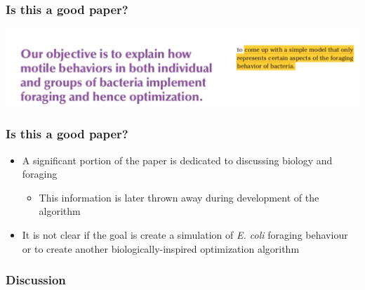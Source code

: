 \documentclass{beamer}
\begin{document}
\begin{frame}
\frametitle{Is this a good paper?}
\begin{center}
\includegraphics[scale=0.3]{assets/yikes}
\end{center}
\end{frame}

\begin{frame}
\frametitle{Is this a good paper?}
\begin{itemize}
  \item<1-> A significant portion of the paper is dedicated to discussing biology and foraging
  \begin{itemize}
    \item <1-> This information is later thrown away during development of the algorithm
  \end{itemize}
  \item<2-> It is not clear if the goal is create a simulation of \textit{E. coli} foraging behaviour or to create another biologically-inspired optimization algorithm
\end{itemize}
\end{frame}

\begin{frame}
\frametitle{Discussion}
\end{frame}
\end{document}
